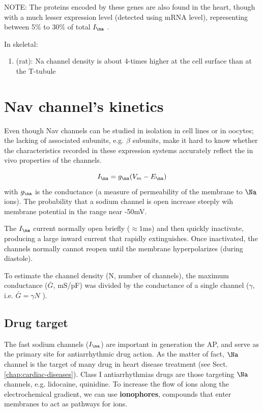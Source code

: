 NOTE: The proteins encoded by these genes are also found in the heart, though
with a much lesser expression level (detected using mRNA level), representing
between 5\% to 30\% of total $I_\na$ \citep{brette2006}.


In skeletal:
\begin{enumerate}
  \item \citep{brette2006} (rat): Na channel density is about 4-times higher at the cell
    surface than at the T-tubule \citep{jaimovich1976}
\end{enumerate}
  
  

\section{Nav channel's kinetics}
\label{sec:i_na-channels}
\label{sec:Nav-channel-kinetics}

Even though Nav channels can be studied in isolation in cell lines or in
oocytes; the lacking of associated subunits, e.g. $\beta$ subunits, make it hard
to know whether the characteristics recorded in these expression systems
accurately reflect the in vivo properties of the channels.

\begin{equation}
I_\na = g_\na (V_m-E_\na)
\end{equation}
with $g_\na$ is the conductance (a measure of permeability of the membrane to
$\Na$ ions).  The probability that a sodium channel is open increase steeply wih
membrane potential in the range near -50mV.

The $I_\na$ current normally open briefly ($\approx 1$ms) and then quickly
inactivate, producing a large inward current that rapidly extinguishes. Once
inactivated, the channels normally cannot reopen until the membrane
hyperpolarizes (during diastole).

To estimate the channel density (N, number of channels), the maximum conductance
($\bar{G}$, mS/pF) was divided by the conductance of a single channel ($\gamma$,
i.e. $\bar{G}=\gamma N$ \citep{hille1978ice}).





\subsection{Drug target}

The fast sodium channels ($I_\na$) are important in generation
the AP, and serve as the primary site for antiarrhythmic drug action. As the
matter of fact, $\Na$ channel is the target of many drug in heart disease
treatment (see Sect.\ref{chap:cardiac-diseases}).
Class I antiarrhythmias drugs are those targeting $\Na$ channels, e.g.
lidocaine, quinidine. To increase the flow of ions along the electrochemical
gradient, we can use {\bf ionophores}, compounds that enter membranes to act as
pathways for ions.


